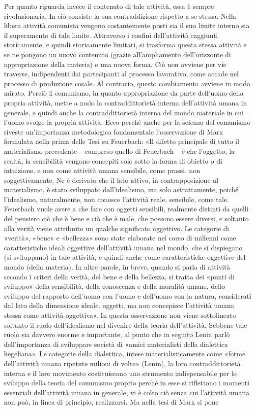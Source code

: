 \documentclass[../main]{subfiles}
\begin{document}
Per quanto riguarda invece il contenuto di tale attività, essa è sempre rivoluzionaria. In ciò consiste la sua contraddizione rispetto a se stessa. Nella libera attività comunista vengono costantemente posti sia il suo limite interno sia il superamento di tale limite. Attraverso i confini dell'attività raggiunti storicamente, e quindi storicamente limitati, si trasforma questa stessa attività e se ne pongono un nuovo contenuto (grazie all'ampliamento dell'orizzonte di appropriazione della materia) e una nuova forma. Ciò non avviene per vie traverse, indipendenti dai partecipanti al processo lavorativo, come accade nel processo di produzione cosale. Al contrario, questo cambiamento avviene in modo mirato. Perciò il comunismo, in quanto appropriazione da parte dell'uomo della propria attività, mette a nudo la contraddittorietà interna dell'attività umana in generale, e quindi anche la contraddittorietà interna del mondo materiale in cui l'uomo svolge la propria attività. Ecco perché anche per la scienza del comunismo riveste un'importanza metodologica fondamentale l'osservazione di Marx formulata nella prima delle Tesi su Feuerbach: «Il difetto principale di tutto il materialismo precedente – compreso quello di Feuerbach – è che l'oggetto, la realtà, la sensibilità vengono concepiti solo sotto la forma di obietto o di intuizione, e non come attività umana sensibile, come prassi, non soggettivamente. Ne è derivato che il lato attivo, in contrapposizione al materialismo, è stato sviluppato dall'idealismo, ma solo astrattamente, poiché l'idealismo, naturalmente, non conosce l'attività reale, sensibile, come tale. Feuerbach vuole avere a che fare con oggetti sensibili, realmente distinti da quelli del pensiero ciò che è bene e ciò che è male, che possono essere diversi, e soltanto alla verità viene attribuito un qualche significato oggettivo. Le categorie di «verità», «bene» e «bellezza» sono state elaborate nel corso di millenni come caratteristiche ideali oggettive dell'attività umana nel mondo, che si dispiegano (si sviluppano) in tale attività, e quindi anche come caratteristiche oggettive del mondo (della materia). In altre parole, in breve, quando si parla di attività secondo i criteri della verità, del bene e della bellezza, si tratta dei «punti di sviluppo» della sensibilità, della conoscenza e della moralità umane, dello sviluppo del rapporto dell'uomo con l'uomo e dell'uomo con la natura, considerati dal lato della dimensione ideale. oggetti, ma non concepisce l'attività umana stessa come attività oggettiva». In questa osservazione non viene sottolineato soltanto il ruolo dell'idealismo nel divenire della teoria dell'attività. Sebbene tale ruolo sia davvero enorme e importante, al punto che in seguito Lenin parlò dell'importanza di sviluppare società di «amici materialisti della dialettica hegeliana». Le categorie della dialettica, intese materialisticamente come «forme dell'attività umana ripetute milioni di volte» (Lenin), la loro contraddittorietà interna e il loro movimento costituiscono uno strumento indispensabile per lo sviluppo della teoria del comunismo proprio perché in esse si riflettono i momenti essenziali dell'attività umana in generale, vi è colto ciò senza cui l'attività umana non può, in linea di principio, realizzarsi. Ma nella tesi di Marx si pone 
\end{document}
